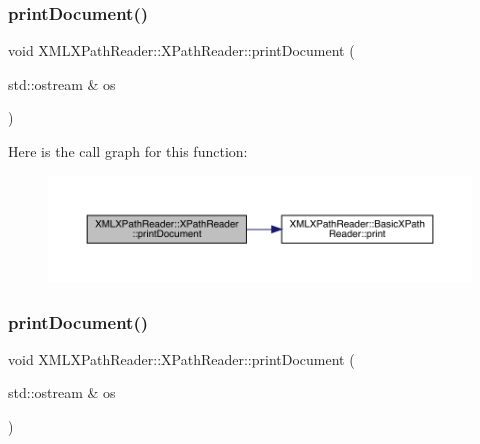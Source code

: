 \subsubsection{\texorpdfstring{printDocument()}{printDocument()}\hspace{0.1cm}{\footnotesize\ttfamily [1/3]}}
{\footnotesize\ttfamily void X\+M\+L\+X\+Path\+Reader\+::\+X\+Path\+Reader\+::print\+Document (\begin{DoxyParamCaption}\item[{std\+::ostream \&}]{os }\end{DoxyParamCaption})\hspace{0.3cm}{\ttfamily [inline]}}

Here is the call graph for this function\+:
\nopagebreak
\begin{figure}[H]
\begin{center}
\leavevmode
\includegraphics[width=350pt]{d3/d5a/classXMLXPathReader_1_1XPathReader_a5505bd1ad902828907e2562947719fef_cgraph}
\end{center}
\end{figure}
\mbox{\label{classXMLXPathReader_1_1XPathReader_a5505bd1ad902828907e2562947719fef}} 
\subsubsection{\texorpdfstring{printDocument()}{printDocument()}\hspace{0.1cm}{\footnotesize\ttfamily [2/3]}}
{\footnotesize\ttfamily void X\+M\+L\+X\+Path\+Reader\+::\+X\+Path\+Reader\+::print\+Document (\begin{DoxyParamCaption}\item[{std\+::ostream \&}]{os }\end{DoxyParamCaption})\hspace{0.3cm}{\ttfamily [inline]}}

